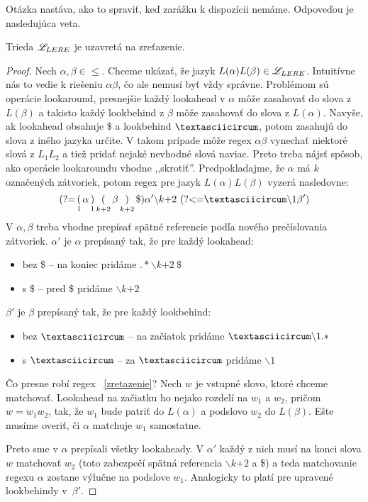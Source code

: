 Otázka nastáva, ako to spraviť, keď zarážku k dispozícii nemáme. Odpoveďou je nasledujúca veta.

\begin{veta}
Trieda $\mathscr{L}_{LERE}$ je uzavretá na zreťazenie.
\end{veta}
\begin{proof}
Nech $\alpha, \beta\in \le$. Chceme ukázať, že jazyk $L(\alpha)L(\beta) \in \mathscr{L}_{LERE}$. Intuitívne nás to vedie k riešeniu $\alpha\beta$, čo ale nemusí byť vždy správne. Problémom sú operácie lookaround, presnejšie každý lookahead v $\alpha$ môže zasahovať do slova z $L(\beta)$ a takisto každý lookbehind z $\beta$ môže zasahovať do slova z $L(\alpha)$. Navyše, ak lookahead obsahuje $\$$ a lookbehind $\textasciicircum$, potom zasahujú do slova z iného jazyka určite. V takom prípade môže regex $\alpha\beta$ vynechať niektoré slová z $L_1L_2$ a tiež pridať nejaké nevhodné slová naviac. Preto treba nájsť spôsob, ako operácie lookaroundu vhodne ,,skrotiť''. Predpokladajme, že $\alpha$ má $k$ označených zátvoriek, potom regex pre jazyk $L(\alpha)L(\beta)$ vyzerá nasledovne:
\begin{equation} \label{zretazenie}
\lookahead \mathop(_1 \alpha \mathop)_1 \mathop(_{k+2}\beta \mathop)_{k+2} \mathdollar) \alpha ' \backslash \text{$k$+2} ~\lookbehind \textasciicircum\backslash 1\beta ')
\end{equation}
V $\alpha,\beta$ treba vhodne prepísať spätné referencie podľa nového prečíslovania zátvoriek. $\alpha '$ je $\alpha$ prepísaný tak, že pre každý lookahead:
\begin{itemize}
\item bez \$ -- na koniec pridáme $.* \backslash \text{$k$+2} ~\mathdollar $
\item s \$ -- pred \$ pridáme $\backslash \text{$k$+2}$
\end{itemize}
$\beta '$ je $\beta$ prepísaný tak, že pre každý lookbehind:
\begin{itemize}
\item bez $\textasciicircum$ -- na začiatok pridáme $\textasciicircum \backslash 1.*$
\item s $\textasciicircum$ -- za $\textasciicircum$ pridáme $ \backslash 1$
\end{itemize}
Čo presne robí regex ~\ref{zretazenie}? Nech $w$ je vstupné slovo, ktoré chceme matchovať. Lookahead na začiatku ho nejako rozdelí na $w_1$ a $w_2$, pričom $w=w_1w_2$, tak, že $w_1$ bude patriť do $L(\alpha)$ a podslovo $w_2$ do $L(\beta)$. Ešte musíme overiť, či $\alpha$ matchuje $w_1$ samostatne.

Preto sme v $\alpha$ prepísali všetky lookaheady. V $\alpha '$ každý z nich musí na konci slova $w$ matchovať $w_2$ (toto zabezpečí spätná referencia $\backslash \text{$k$+2}$ a \$) a teda matchovanie regexu $\alpha$ zostane výlučne na podslove $w_1$. Analogicky to platí pre upravené lookbehindy v~$\beta '$.

\end{proof}

